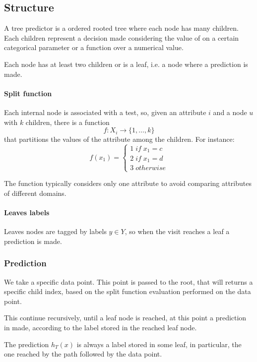 \subsection{Structure}
A tree predictor is a ordered rooted tree where each node has many children.
Each children represent a decision made considering the value
of on a certain categorical parameter or a function over a numerical value.

Each node has at least two children or is a leaf, i.e. a node where a prediction is 
made.

\paragraph{Split function}
Each internal node is associated with a test, so, given an attribute 
$i$ and a node $u$ with $k$ children, there is a function
$$f : X_i \rightarrow \{1, \dots, k\}$$
that partitions the values of the attribute among the children.
For instance:
\[ 
    f(x_1) = \begin{cases}
        1 \mathit{\;if\;} x_1 = c\\
        2 \mathit{\;if\;} x_1 = d\\
        3 \mathit{\;otherwise}
    \end{cases}\]

\begin{remark}
    The function typically considers only one attribute to avoid 
    comparing attributes of different domains.
\end{remark}

\paragraph{Leaves labels}
Leaves nodes are tagged by labels $y \in Y$, so when the visit reaches a leaf 
a prediction is made.

\subsubsection{Prediction}
We take a specific data point. This point is passed to the root, that will 
returns a specific child index, based on the split function evaluation 
performed on the data point.

This continue recursively, until a leaf node is reached, at this point 
a prediction in made, according to the label stored in the reached leaf 
node.

The prediction $h_T(x)$ is always a label stored in some leaf, in particular, the one 
reached by the path followed by the data point.

